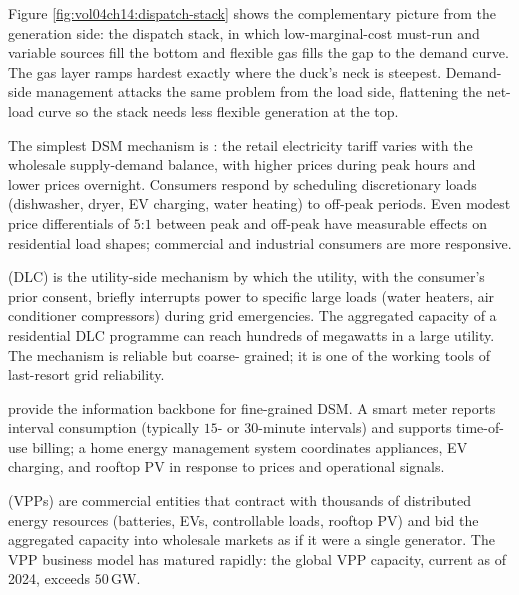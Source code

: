 

Figure \ref{fig:vol04ch14:dispatch-stack} shows the complementary
picture from the generation side: the dispatch stack, in which
low-marginal-cost must-run and variable sources fill the bottom and
flexible gas fills the gap to the demand curve. The gas layer ramps
hardest exactly where the duck's neck is steepest. Demand-side
management attacks the same problem from the load side, flattening the
net-load curve so the stack needs less flexible generation at the top.

The simplest DSM mechanism is : the
retail electricity tariff varies with the wholesale supply-demand
balance, with higher prices during peak hours and lower prices
overnight. Consumers respond by scheduling discretionary loads
(dishwasher, dryer, EV charging, water heating) to off-peak periods.
Even modest price differentials of $5$:$1$ between peak and off-peak
have measurable effects on residential load shapes; commercial and
industrial consumers are more responsive.

 (DLC) is the utility-side mechanism by
which the utility, with the consumer's prior consent, briefly
interrupts power to specific large loads (water heaters, air
conditioner compressors) during grid emergencies. The aggregated
capacity of a residential DLC programme can reach hundreds of
megawatts in a large utility. The mechanism is reliable but coarse-
grained; it is one of the working tools of last-resort grid
reliability.

 provide the
information backbone for fine-grained DSM. A smart meter reports
interval consumption (typically $15$- or $30$-minute intervals) and
supports time-of-use billing; a home energy management system
coordinates appliances, EV charging, and rooftop PV in response to
prices and operational signals.

 (VPPs) are commercial
entities that contract with thousands of distributed energy resources
(batteries, EVs, controllable loads, rooftop PV) and bid the
aggregated capacity into wholesale markets as if it were a single
generator. The VPP business model has matured rapidly: the global
VPP capacity, current as of 2024, exceeds $50\,\si{\giga\watt}$.

